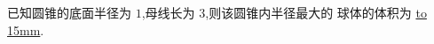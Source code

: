 \documentclass[class=ctexart,crop=false]{standalone}
\begin{document}
已知圆锥的底面半径为 $1$,母线长为 $3$,则该圆锥内半径最大的
球体的体积为 \underline{\hbox to 15mm{}}.
\end{document}
